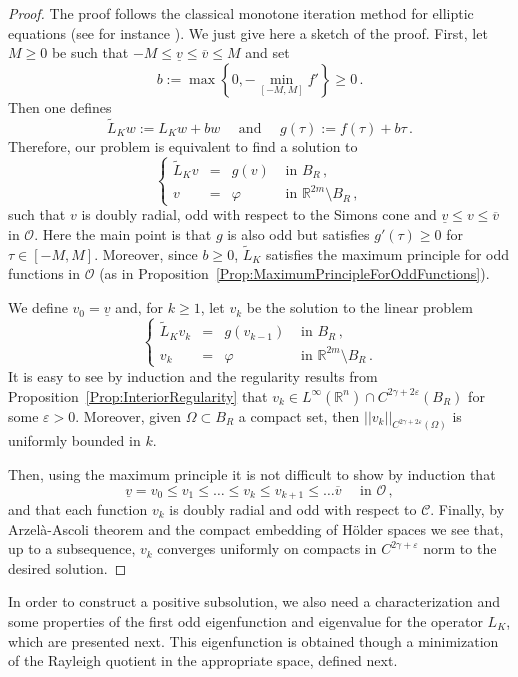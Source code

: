 \documentclass[12pt,reqno]{amsart}
\theoremstyle{definition}
\theoremstyle{remark}
\newcommand{\con}[1]{\mathbb{#1}}
\newcommand{\R}{\con{R}} %
\newcommand{\ccal}{\mathscr{C}}
\newcommand{\ocal}{\mathcal{O}}
\newcommand{\s}{\gamma}
\newcommand\beqc[1]{\left\{\begin{array}{#1}}
\newcommand\eeqc{\end{array} \right.}
\def\PDEsystem{rcll}
\newcommand{\vsub}{\underline{v}}
\newcommand{\vsup}{\overline{v}}
\numberwithin{equation}{section}
\begin{document}
\begin{proof}
	The proof follows the classical monotone iteration method for elliptic equations (see for instance \cite{Evans}). We just give here a sketch of the proof. 
	First, let $M \geq 0$ be such that $-M \leq \vsub \leq \vsup \leq M$ and set
	$$
	b := \max \left \{{0, - \min_{[-M,M]}f'}\right \}\geq 0\,.
	$$
	Then one defines 
	$$
	\widetilde{L}_K w := L_Kw + b w 	\quad \text{ and } \quad 	g(\tau) := f(\tau) + b \tau\,.
	$$
	Therefore, our problem is equivalent to find a solution to
	$$
	\beqc{\PDEsystem}
	\widetilde{L}_Kv & = & g(v) & \textrm{ in } B_R\,, \\
	v &=& \varphi &  \textrm{ in } \R^{2m} \setminus B_R\,, 
	\eeqc
	$$
	such that $v$ is doubly radial, odd with respect to the Simons cone and  $\vsub \leq v \leq \vsup$ in $\ocal$. Here the main point is that $g$ is also odd but satisfies $g'(\tau) \geq 0$ for $\tau \in [-M,M]$. Moreover, since $b \geq 0$, $\widetilde{L}_K$ satisfies the maximum principle for odd functions in $\ocal$ (as in Proposition~\ref{Prop:MaximumPrincipleForOddFunctions}).
	
	We define $v_0 = \vsub$ and, for $k\geq 1$, let $v_k$ be the solution to the linear problem
	$$
	\beqc{\PDEsystem}
	\tilde{L}_K v_k & = & g(v_{k-1}) & \textrm{ in } B_R\,, \\
	v_k &=& \varphi &  \textrm{ in } \R^{2m} \setminus B_R\,. 
	\eeqc
	$$
	It is easy to see by induction and the regularity results from Proposition~\ref{Prop:InteriorRegularity} that $v_k\in L^\infty(\R^n) \cap C^{2\s+2\varepsilon}(B_R)$ for some $\varepsilon>0$. Moreover, given $\Omega\subset B_R$ a compact set, then $||v_k||_{C^{2\s+2\varepsilon}(\Omega)}$ is uniformly bounded in $k$.
	
	Then, using the maximum principle it is not difficult to show by induction that 
	$$
	\vsub = v_0 \leq v_1 \leq \ldots \leq v_k \leq v_{k+1} \leq \ldots \vsup \quad \text{ in }\ocal\,,
	$$
	and that each function $v
	_k$ is doubly radial and odd with respect to $\ccal$. Finally, by Arzelà-Ascoli theorem and the compact embedding of H\"older spaces we see that, up to a subsequence, $v_k$ converges uniformly on compacts in $C^{2\s+\varepsilon}$ norm to the desired solution.
\end{proof}

In order to construct a positive subsolution, we also need a characterization and some properties of the first odd eigenfunction and eigenvalue for the operator $L_K$, which are presented next. This eigenfunction is obtained though a minimization of the Rayleigh quotient in the appropriate space, defined next.
\end{document}
